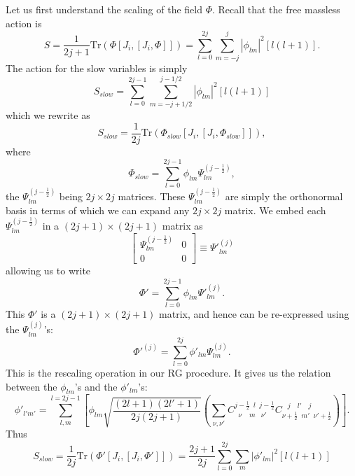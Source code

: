 \documentclass[a4paper,12pt]{article}
\numberwithin{equation}{section}
\begin{document}
Let us first understand the scaling of the field $\Phi$. Recall that
the free massless action is
\begin{equation} 
S = \frac{1}{2j+1} \text{Tr}( \Phi [J_i,[J_i, \Phi]]) =
\sum_{l=0}^{2j} \sum_{m=-j}^{j} |\phi_{lm}|^2[l(l+1)].
\end{equation} 
The action for the slow variables is simply 
\begin{equation}	
S_{slow}=\sum_{l=0}^{2j-1} \sum_{m=-j+1/2}^{j-1/2}
|\phi_{lm}|^2[l(l+1)] 
\end{equation} 
which we rewrite as 
\begin{equation} 
S_{slow} = \frac{1}{2j} \text{Tr} (\Phi_{slow}[J_i,[J_i, \Phi_{slow}]]),
\end{equation}
where
\begin{equation} 
\Phi_{slow} = \sum_{l=0}^{2j-1} \phi_{lm} \Psi^{(j-\frac{1}{2})}_{lm},
\end{equation}	
the $\Psi^{(j-\frac{1}{2})}_{lm}$ being $2j \times 2j$ matrices. These
$\Psi^{(j-\frac{1}{2})}_{lm}$ are simply the orthonormal basis in
terms of which we can expand any $2j \times 2j$ matrix. We embed each
$\Psi^{(j-\frac{1}{2})}_{lm}$ in a $(2j+1) \times (2j+1)$ matrix as
\begin{equation} 
\left[ \begin{array}{cc}
	    \Psi^{(j-\frac{1}{2})}_{lm} & 0 \\
		0     &  0
	\end{array}
\right] \equiv {\Psi'}^{(j)}_{lm}
\end{equation}     
allowing us to write
\begin{equation} 
\Phi' = \sum_{l=0}^{2j-1} \phi_{lm} {\Psi'}^{(j)}_{lm}.
\end{equation}
This $\Phi'$ is a $(2j+1)\times(2j+1)$ matrix, and hence can be
re-expressed using the $\Psi^{(j)}_{lm}$'s:
\begin{equation} 
{\Phi'}^{(j)} = \sum_{l=0}^{2j} \phi'_{lm} \Psi^{(j)}_{lm}.
\end{equation} 
This is the rescaling operation in our RG procedure. It gives us the
relation between the $\phi_{lm}$'s and the $\phi'_{lm}$'s:
\begin{equation} 
\phi'_{l' m'} = \sum_{l,m}^{l=2j-1} \left[\phi_{lm} \sqrt{\frac{(2l+1)(2l'
+1)}{2j(2j+1)}} \left(\sum_{\nu, \nu'}C_{\;\;\nu \;\;\;\; m \;\;\;
\nu'}^{j-\frac{1}{2}\;\; l\;\; j-\frac{1}{2}} C_{\nu+\frac{1}{2} 
\;\;m' \;\;\nu' +\frac{1}{2}}^{\;\;\; j \quad l' \quad j} \right)\right].
\end{equation} 
Thus
\begin{equation} 
S_{slow} = \frac{1}{2j} \text{Tr}(\Phi' [J_i,[J_i, \Phi']]) =
\frac{2j+1}{2j} \sum_{l=0}^{2j} \sum_m |\phi'_{lm}|^2 [l(l+1)]
\end{equation} 
\end{document}
